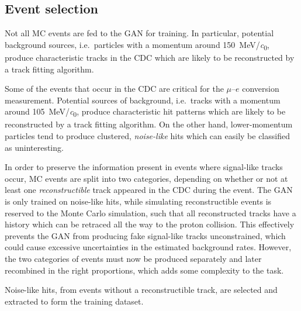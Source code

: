 \subsection{Event selection}


Not all MC events are fed to the GAN for training. In particular, potential background sources, i.e.\ particles with a momentum around \SI{150}{MeV/\clight}, produce characteristic tracks in the CDC which are likely to be reconstructed by a track fitting algorithm. 

Some of the events that occur in the CDC are critical for the $\mu$--$e$ conversion measurement. Potential sources of background, i.e.\ tracks with a momentum around \SI{105}{\MeV/\clight}, produce characteristic hit patterns which are likely to be reconstructed by a track fitting algorithm. On the other hand, lower-momentum particles tend to produce clustered, \emph{noise-like} hits which can easily be classified as uninteresting.

In order to preserve the information present in events where signal-like tracks occur,  MC events are split into two categories, depending on whether or not at least one \emph{reconstructible} track appeared in the CDC during the event. The GAN is only trained on noise-like hits, while simulating reconstructible events is reserved to the Monte Carlo simulation, such that all reconstructed tracks have a history which can be retraced all the way to the proton collision. This effectively prevents the GAN from producing fake signal-like tracks unconstrained, which could cause excessive uncertainties in the estimated background rates. However, the two categories of events must now be produced separately and later recombined in the right proportions, which adds some complexity to the task.


Noise-like hits, from events without a reconstructible track, are selected and extracted to form the training dataset. 



